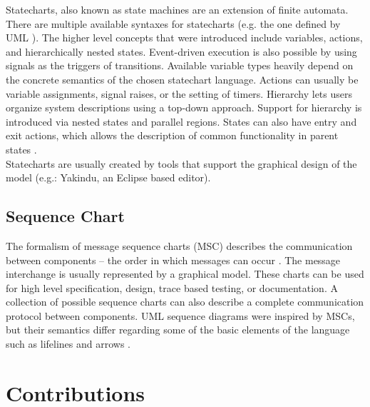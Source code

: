 Statecharts, also known as state machines are an extension of finite automata. There are multiple available syntaxes for statecharts (e.g. the one defined by UML \citep{stcuml}). The higher level concepts that were introduced include variables, actions, and hierarchically nested states. Event-driven execution is also possible by using signals as the triggers of transitions. Available variable types heavily depend on the concrete semantics of the chosen statechart language. Actions can usually be variable assignments, signal raises, or the setting of timers. Hierarchy lets users organize system descriptions using a top-down approach. Support for hierarchy is introduced via nested states and parallel regions. States can also have entry and exit actions, which allows the description of common functionality in parent states \citep{stcmove}.\\
Statecharts are usually created by tools that support the graphical design of the model (e.g.: Yakindu, an Eclipse based editor).


\subsection*{Sequence Chart}

The formalism of message sequence charts (MSC) describes the communication between components -- the order in which messages can occur \citep{msc} \citep{msc2}. The message interchange is usually represented by a graphical model. These charts can be used for high level specification, design, trace based testing, or documentation. A collection of possible sequence charts can also describe a complete communication protocol between components. UML sequence diagrams were inspired by MSCs, but their semantics differ regarding some of the basic elements of the language such as lifelines and arrows \citep{mscuml}.

\section*{Contributions}

